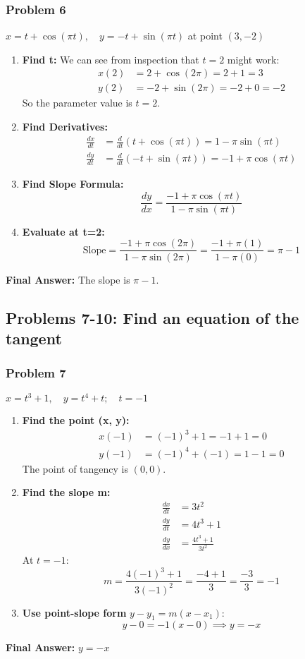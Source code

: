 \documentclass{article}
\begin{document}
\subsubsection{Problem 6}
$x = t + \cos(\pi t), \quad y = -t + \sin(\pi t)$ at point $(3, -2)$
\begin{enumerate}
    \item \textbf{Find t:}
    We can see from inspection that $t=2$ might work:
    \begin{align*}
    x(2) &= 2 + \cos(2\pi) = 2 + 1 = 3 \\
    y(2) &= -2 + \sin(2\pi) = -2 + 0 = -2
    \end{align*}
    So the parameter value is $t=2$.
    \item \textbf{Find Derivatives:}
    \begin{align*}
    \frac{dx}{dt} &= \frac{d}{dt}(t + \cos(\pi t)) = 1 - \pi\sin(\pi t) \\
    \frac{dy}{dt} &= \frac{d}{dt}(-t + \sin(\pi t)) = -1 + \pi\cos(\pi t)
    \end{align*}
    \item \textbf{Find Slope Formula:}
    \[ \frac{dy}{dx} = \frac{-1 + \pi\cos(\pi t)}{1 - \pi\sin(\pi t)} \]
    \item \textbf{Evaluate at t=2:}
    \[ \text{Slope} = \frac{-1 + \pi\cos(2\pi)}{1 - \pi\sin(2\pi)} = \frac{-1 + \pi(1)}{1 - \pi(0)} = \pi - 1 \]
\end{enumerate}
\textbf{Final Answer:} The slope is $\pi - 1$.

\subsection{Problems 7-10: Find an equation of the tangent}

\subsubsection{Problem 7}
$x = t^3 + 1, \quad y = t^4 + t; \quad t = -1$
\begin{enumerate}
    \item \textbf{Find the point (x, y):}
    \begin{align*}
    x(-1) &= (-1)^3 + 1 = -1 + 1 = 0 \\
    y(-1) &= (-1)^4 + (-1) = 1 - 1 = 0
    \end{align*}
    The point of tangency is $(0, 0)$.
    \item \textbf{Find the slope m:}
    \begin{align*}
    \frac{dx}{dt} &= 3t^2 \\
    \frac{dy}{dt} &= 4t^3 + 1 \\
    \frac{dy}{dx} &= \frac{4t^3 + 1}{3t^2}
    \end{align*}
    At $t=-1$:
    \[ m = \frac{4(-1)^3 + 1}{3(-1)^2} = \frac{-4 + 1}{3} = \frac{-3}{3} = -1 \]
    \item \textbf{Use point-slope form} $y - y_1 = m(x - x_1)$:
    \[ y - 0 = -1(x - 0) \implies y = -x \]
\end{enumerate}
\textbf{Final Answer:} $y = -x$
\end{document}
